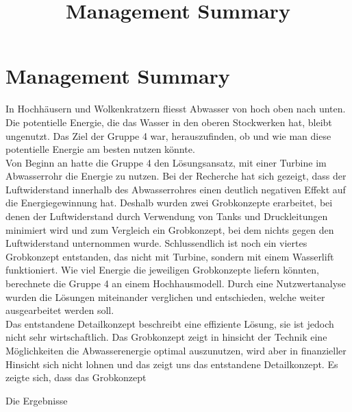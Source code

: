 \documentclass[12pt]{article}
\title{Management Summary}
\begin{document}
\section*{Management Summary}
In Hochhäusern und Wolkenkratzern fliesst Abwasser von hoch oben nach unten. Die potentielle Energie, die das Wasser in den oberen Stockwerken hat, bleibt ungenutzt. Das Ziel der Gruppe 4 war, herauszufinden, ob und wie man diese potentielle Energie am besten nutzen könnte.\\


Von Beginn an hatte die Gruppe 4 den Lösungsansatz, mit einer Turbine im Abwasserrohr die Energie zu nutzen. Bei der Recherche hat sich gezeigt, dass der Luftwiderstand innerhalb des Abwasserrohres einen deutlich negativen Effekt auf die Energiegewinnung hat. Deshalb wurden zwei Grobkonzepte erarbeitet, bei denen der Luftwiderstand durch Verwendung von Tanks und Druckleitungen minimiert wird und zum Vergleich ein Grobkonzept, bei dem nichts gegen den Luftwiderstand unternommen wurde. Schlussendlich ist noch ein viertes Grobkonzept entstanden, das nicht mit Turbine, sondern mit einem Wasserlift funktioniert. Wie viel Energie die jeweiligen Grobkonzepte liefern könnten, berechnete die Gruppe 4 an einem Hochhausmodell. Durch eine Nutzwertanalyse wurden die Lösungen miteinander verglichen und entschieden, welche weiter ausgearbeitet werden soll.\\


Das entstandene Detailkonzept beschreibt eine effiziente Lösung, sie ist jedoch nicht sehr wirtschaftlich. 
Das Grobkonzept zeigt in hinsicht der Technik eine Möglichkeiten die Abwasserenergie optimal auszunutzen, wird aber in finanzieller Hinsicht sich nicht lohnen und das zeigt uns das entstandene Detailkonzept.
Es zeigte sich, dass das Grobkonzept


Die Ergebnisse 
\end{document}
